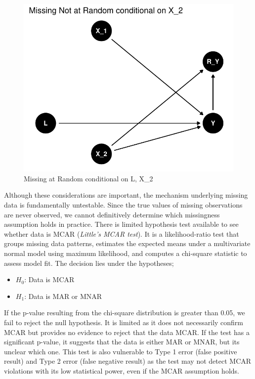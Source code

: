 \documentclass{article}
\providecommand{\tightlist}{%
  \setlength{\itemsep}{0pt}\setlength{\parskip}{0pt}}
\newcommand{\pandocbounded}[1]{#1}
\begin{document}
\begin{figure}
\centering
\pandocbounded{\includegraphics[keepaspectratio]{Final_Report_files/figure-latex/unnamed-chunk-5-1.pdf}}
\caption{Missing at Random conditional on L, X\_2}
\end{figure}

Although these considerations are important, the mechanism underlying
missing data is fundamentally untestable. Since the true values of
missing observations are never observed, we cannot definitively
determine which missingness assumption holds in practice. There is
limited hypothesis test available to see whether data is MCAR
(\emph{Little's MCAR test}). It is a likelihood-ratio test that groups
missing data patterns, estimates the expected means under a multivariate
normal model using maximum likelihood, and computes a chi-square
statistic to assess model fit. The decision lies under the hypotheses;

\begin{itemize}
\tightlist
\item
  \(H_0\): Data is MCAR
\item
  \(H_1\): Data is MAR or MNAR
\end{itemize}

If the p-value resulting from the chi-square distribution is greater
than 0.05, we fail to reject the null hypothesis. It is limited as it
does not necessarily confirm MCAR but provides no evidence to reject
that the data MCAR. If the test has a significant p-value, it suggests
that the data is either MAR or MNAR, but its unclear which one. This
test is also vulnerable to Type 1 error (false positive result) and Type
2 error (false negative result) as the test may not detect MCAR
violations with its low statistical power, even if the MCAR assumption
holds.
\end{document}
